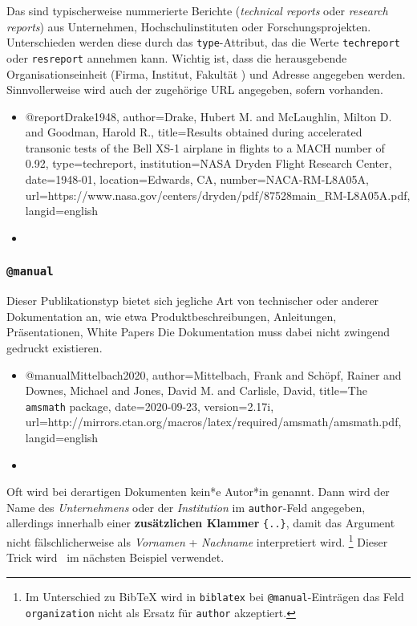 Das sind typischerweise nummerierte Berichte (\emph{technical reports} oder \emph{research reports}) aus Unternehmen,
Hochschulinstituten oder Forschungsprojekten. Unterschieden werden diese durch das \texttt{type}-Attribut, das die
Werte \texttt{techreport} oder \texttt{resreport} annehmen kann. Wichtig ist, dass die herausgebende
Organisationseinheit (Firma, Institut, Fakultät \etc) und Adresse angegeben werden. Sinnvollerweise wird auch der
zugehörige URL angegeben, sofern vorhanden.
%
\begin{itemize}
\item[]
\begin{GenericCode}[numbers=none]
@report{Drake1948,
  author={Drake, Hubert M. and McLaughlin, Milton D. and Goodman, Harold R.},
  title={Results obtained during accelerated transonic tests of the {Bell} {XS-1} airplane in flights to a {MACH} number of 0.92},
  type={techreport},
  institution={NASA Dryden Flight Research Center},
  date={1948-01},
  location={Edwards, CA},
  number={NACA-RM-L8A05A},
  url={https://www.nasa.gov/centers/dryden/pdf/87528main_RM-L8A05A.pdf},
  langid={english}
}
\end{GenericCode}
\item[\cite{Drake1948}] 
\end{itemize}


\subsubsection{\texttt{\bfseries @manual}}
\label{sec:@manual}
Dieser Publikationstyp bietet sich jegliche Art von technischer oder anderer Dokumentation an, wie etwa
Produktbeschreibungen, Anleitungen, Präsentationen, White Papers \usw Die Dokumentation muss dabei nicht zwingend
gedruckt existieren.
%
\begin{itemize}
\item[]
\begin{GenericCode}[numbers=none]
@manual{Mittelbach2020,
  author={Mittelbach, Frank and Schöpf, Rainer and Downes, Michael and Jones, David M. and Carlisle, David},
  title={The \texttt{amsmath} package},
  date={2020-09-23},
  version={2.17i},
  url={http://mirrors.ctan.org/macros/latex/required/amsmath/amsmath.pdf},
  langid={english}
}
\end{GenericCode}
\item[\cite{Mittelbach2020}] 
\end{itemize}
%
Oft wird bei derartigen Dokumenten kein*e Autor*in genannt. Dann wird der Name des \emph{Unternehmens} oder der
\emph{Institution} im \texttt{author}-Feld angegeben, allerdings innerhalb einer \textbf{zusätzlichen Klammer}
\texttt{\{..\}}, damit das Argument nicht fälschlicherweise als \emph{Vornamen} + \emph{Nachname} interpretiert wird.%
\footnote{Im Unterschied zu BibTeX wird in \texttt{biblatex} bei \texttt{@manual}-Einträgen das Feld
\texttt{organization} nicht als Ersatz für \texttt{author} akzeptiert.}
Dieser Trick wird \ua\ im nächsten Beispiel verwendet.


